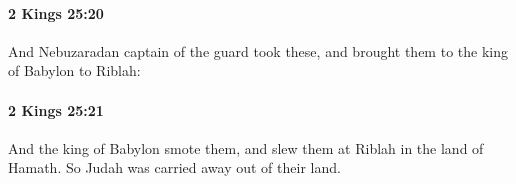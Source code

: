 		\paragraph{2 Kings 25:20} %
			\label{2KINGS-25-20}

			And Nebuzaradan captain of the guard took these, and brought them to the king of Babylon to Riblah:


		\paragraph{2 Kings 25:21} %
			\label{2KINGS-25-21}

			And the king of Babylon smote them, and slew them at Riblah in the land of Hamath. So Judah was carried away out of their land.


